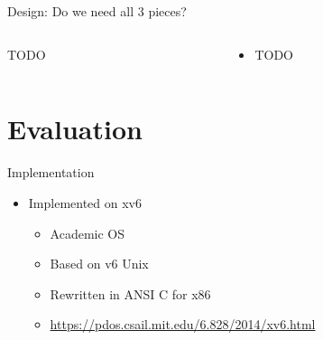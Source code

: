 \documentclass[aspectratio=169]{beamer}
\newcommand{\bi}{\begin{itemize}}
\newcommand{\ei}{\end{itemize}}
\begin{document}
\begin{frame}{Design: Do we need all 3 pieces?}
  \begin{columns}[T]
    \begin{column}{0.2\textwidth}
      TODO
    \end{column}
    \begin{column}{0.8\textwidth}
      \bi
    \item TODO
      \ei
    \end{column}
  \end{columns}
\end{frame}

\section{Evaluation}

\begin{frame}{Implementation}
  \begin{center}
    \bi
  \item Implemented on xv6
    \bi
  \item Academic OS
  \item Based on v6 Unix
  \item Rewritten in ANSI C for x86
  \item \url{https://pdos.csail.mit.edu/6.828/2014/xv6.html}
    \ei
    \ei
  \end{center}
\end{frame}
\end{document}
